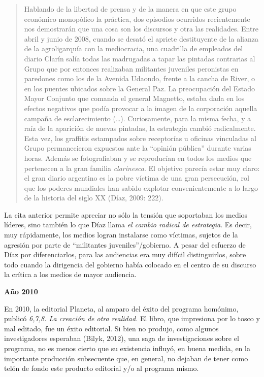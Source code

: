 \begin{quote}
Hablando de la libertad de prensa y de la manera en que este grupo económico monopólico la práctica, dos episodios ocurridos recientemente nos demostrarán que una cosa son los discursos y otra las realidades. Entre abril y junio de 2008, cuando se desató el apriete destituyente de la alianza de la agroligarquía con la mediocracia, una cuadrilla de empleados del diario Clarín salía todas las madrugadas a tapar las pintadas contrarias al Grupo que por entonces realizaban militantes juveniles peronistas en paredones como los de la Avenida Udaondo, frente a la cancha de River, o en los puentes ubicados sobre la General Paz. La preocupación del Estado Mayor Conjunto que comanda el general Magnetto, estaba dada en los efectos negativos que podía provocar a la imagen de la corporación aquella campaña de esclarecimiento (\ldots). Curiosamente, para la misma fecha, y a raíz de la aparición de nuevas pintadas, la estrategia cambió radicalmente. Esta vez, los graffitis estampados sobre receptorías u oficinas vinculadas al Grupo permanecieron expuestos ante la ``opinión pública'' durante varias horas. Además se fotografiaban y se reproducían en todos los medios  que pertenecen a la gran familia \emph{clarinesca}. El objetivo parecía estar muy claro: el gran diario argentino es la pobre víctima de una gran persecución, rol que los poderes mundiales han sabido explotar convenientemente a lo largo de la historia del siglo XX (Díaz, 2009: 222).
\end{quote}

La cita anterior permite apreciar no sólo la tensión que soportaban los medios líderes, sino también lo que Díaz llama \emph{el cambio radical de estrategia}. Es decir, muy rápidamente, los medios logran instalarse como víctimas, sujetos de la agresión por parte de ``militantes juveniles''/gobierno. A pesar del esfuerzo de Díaz por diferenciarlos, para las audiencias era muy difícil distinguirlos, sobre todo cuando la dirigencia del gobierno había colocado en el centro de su discurso la crítica a los medios de mayor audiencia.

\textbf{Año 2010}

En 2010, la editorial Planeta, al amparo del éxito del programa homónimo, publicó \emph{6,7,8. La creación de otra realidad.} El libro, que impresiona por lo tosco y mal editado, fue un éxito editorial. Si bien no produjo, como algunos investigadores esperaban (Bilyk, 2012), una saga de investigaciones sobre el programa, no es menos cierto que su existencia influyó, en buena medida, en la importante producción subsecuente que, en general, no dejaban de tener como telón de fondo este producto editorial y/o al programa mismo.

